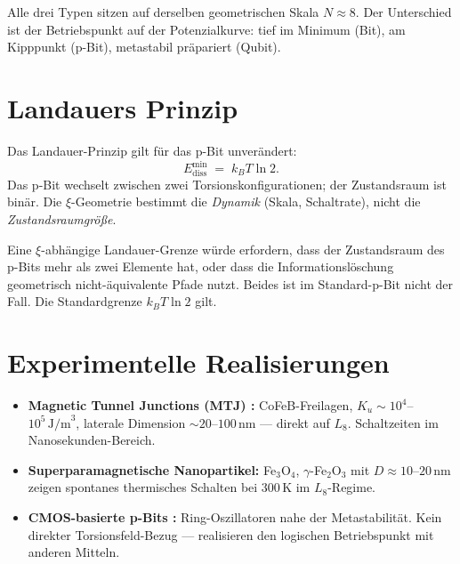 	Alle drei Typen sitzen auf derselben geometrischen Skala $N \approx 8$.
	Der Unterschied ist der Betriebspunkt auf der Potenzialkurve:
	tief im Minimum (Bit), am Kipppunkt (p-Bit), metastabil präpariert (Qubit).
	
	\section{Landauers Prinzip}
	\label{sec:landauer}
	
	Das Landauer-Prinzip \cite{Landauer1961} gilt für das p-Bit unverändert:
	\begin{equation}
		E_\text{diss}^\text{min} \;=\; k_B T \ln 2.
		\label{eq:landauer}
	\end{equation}
	Das p-Bit wechselt zwischen zwei Torsionskonfigurationen; der
	Zustandsraum ist binär. Die $\xi$-Geometrie bestimmt die \emph{Dynamik}
	(Skala, Schaltrate), nicht die \emph{Zustandsraumgröße}.
	
	\begin{important}
		Eine $\xi$-abhängige Landauer-Grenze würde erfordern, dass der
		Zustandsraum des p-Bits mehr als zwei Elemente hat, oder dass
		die Informationslöschung geometrisch nicht-äquivalente Pfade nutzt.
		Beides ist im Standard-p-Bit nicht der Fall.
		Die Standardgrenze $k_BT \ln 2$ gilt.
	\end{important}
	
	\section{Experimentelle Realisierungen}
	\label{sec:experiment}
	
	\begin{itemize}
		\item \textbf{Magnetic Tunnel Junctions (MTJ) \cite{Borders2019}:}
		CoFeB-Freilagen, $K_u \sim 10^4$--$10^5\,\text{J/m}^3$,
		laterale Dimension $\sim 20$--$100\,\text{nm}$ --- direkt auf $L_8$.
		Schaltzeiten im Nanosekunden-Bereich.
		
		\item \textbf{Superparamagnetische Nanopartikel:}
		Fe$_3$O$_4$, $\gamma$-Fe$_2$O$_3$ mit $D \approx 10$--$20\,\text{nm}$
		zeigen spontanes thermisches Schalten bei 300\,K im
		$L_8$-Regime.
		
		\item \textbf{CMOS-basierte p-Bits \cite{Aadit2022}:}
		Ring-Oszillatoren nahe der Metastabilität. Kein direkter
		Torsionsfeld-Bezug --- realisieren den logischen Betriebspunkt
		mit anderen Mitteln.
	\end{itemize}
	
